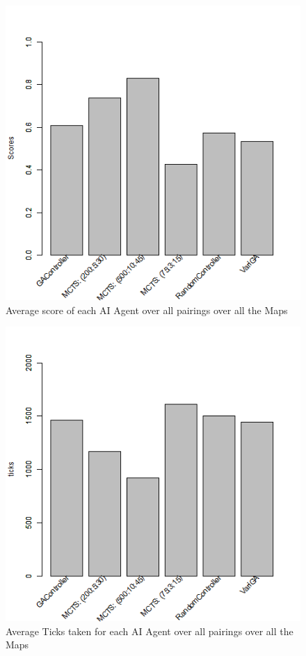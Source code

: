 \documentclass{IEEEtran}
\begin{document}
\begin{figure}[!ht]
\centering
\includegraphics[width=\linewidth]{scores-allmaps}
\caption{Average score of each AI Agent over all pairings over all the Maps}
\label{avgScoreAllMaps}
\end{figure}

\begin{figure}[!ht]
\centering
\includegraphics[width=\linewidth]{ticks-allmaps}
\caption{Average Ticks taken for each AI Agent over all pairings over all the Maps}
\label{avgTicksAllMaps}
\end{figure}
\end{document}
